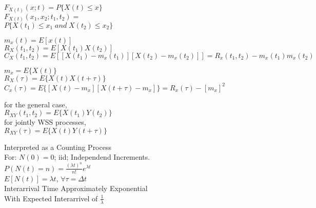 

$F_{X(t)}(x;t)=P\{X(t) \leq x\}$ \\
$F_{X(t)}(x_1,x_2;t_1,t_2)=$ \\ $P\{X(t_1)\leq x_1 \; and \; X(t_2) \leq x_2\}$

$m_x(t)=E[x(t)]$ \\
$R_X(t_1,t_2)=E[X(t_1)X(t_2)]$ \\
$C_X(t_1,t_2)=E[[X(t_1)-m_x(t_1)][X(t_2)-m_x(t_2)]]=R_x(t_1,t_2)-m_x(t_1)m_x(t_2)$

$m_x=E\{X(t)\} $\\
$R_X(\tau)=E\{X(t)X(t+\tau)\}$ \\
$C_x(\tau) =E\{[X(t)-m_x] [X(t+\tau)-m_x]\}= R_x(\tau)-{[m_x]} ^2$ 

for the general case, \\
$R_{XY}(t_1,t_2)=E\{X(t_1)Y(t_2)\}$ \\
for jointly WSS processes, \\
$R_{XY}(\tau)=E\{X(t)Y(t+\tau)\}$


Interpreted as a Counting Process \\
For: $N(0)=0$; iid; Independend Increments. \\
$P(N(t)=n)=\frac{{(\lambda t)}^n}{n!}e^{\lambda t}$\\
$E[N(t)]=\lambda t$, $\forall \tau=\Delta t$\\
Interarrival Time Approximately Exponential\\
With Expected Interarrivel of $\frac{1}{\lambda}$

